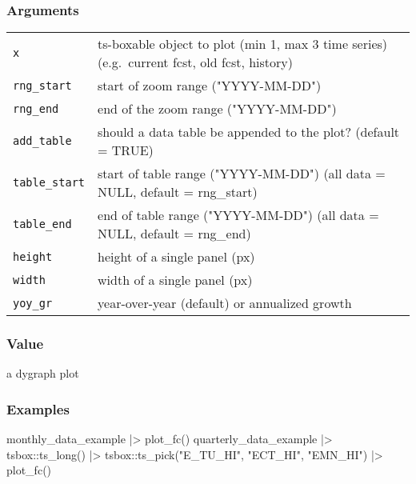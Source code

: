 \documentclass[
  letterpaper,
  DIV=11,
  numbers=noendperiod]{scrreport}
\newenvironment{Shaded}{\begin{snugshade}}{\end{snugshade}}
\newcommand{\FunctionTok}[1]{\textcolor[rgb]{0.28,0.35,0.67}{#1}}
\newcommand{\NormalTok}[1]{\textcolor[rgb]{0.00,0.23,0.31}{#1}}
\newcommand{\SpecialCharTok}[1]{\textcolor[rgb]{0.37,0.37,0.37}{#1}}
\newcommand{\StringTok}[1]{\textcolor[rgb]{0.13,0.47,0.30}{#1}}
\begin{document}
\subsubsection{Arguments}\label{arguments-67}

\begin{longtable}[]{@{}ll@{}}
\toprule\noalign{}
\endhead
\bottomrule\noalign{}
\endlastfoot
\texttt{x} & ts-boxable object to plot (min 1, max 3 time series)
(e.g.~current fcst, old fcst, history) \\
\texttt{rng\_start} & start of zoom range ("YYYY-MM-DD") \\
\texttt{rng\_end} & end of the zoom range ("YYYY-MM-DD") \\
\texttt{add\_table} & should a data table be appended to the plot?
(default = TRUE) \\
\texttt{table\_start} & start of table range ("YYYY-MM-DD") (all data =
NULL, default = rng\_start) \\
\texttt{table\_end} & end of table range ("YYYY-MM-DD") (all data =
NULL, default = rng\_end) \\
\texttt{height} & height of a single panel (px) \\
\texttt{width} & width of a single panel (px) \\
\texttt{yoy\_gr} & year-over-year (default) or annualized growth \\
\end{longtable}

\subsubsection{Value}\label{value-65}

a dygraph plot

\subsubsection{Examples}\label{examples-67}

\begin{Shaded}
\begin{Highlighting}[]
\NormalTok{monthly\_data\_example }\SpecialCharTok{|\textgreater{}}
  \FunctionTok{plot\_fc}\NormalTok{()}
\NormalTok{quarterly\_data\_example }\SpecialCharTok{|\textgreater{}}
\NormalTok{  tsbox}\SpecialCharTok{::}\FunctionTok{ts\_long}\NormalTok{() }\SpecialCharTok{|\textgreater{}}
\NormalTok{  tsbox}\SpecialCharTok{::}\FunctionTok{ts\_pick}\NormalTok{(}\StringTok{"E\_TU\_HI"}\NormalTok{, }\StringTok{"ECT\_HI"}\NormalTok{, }\StringTok{"EMN\_HI"}\NormalTok{) }\SpecialCharTok{|\textgreater{}}
  \FunctionTok{plot\_fc}\NormalTok{()}
\end{Highlighting}
\end{Shaded}
\end{document}
